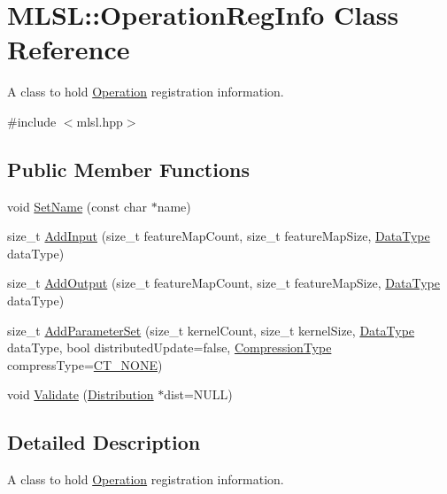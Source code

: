 \hypertarget{classMLSL_1_1OperationRegInfo}{\section{M\-L\-S\-L\-:\-:Operation\-Reg\-Info Class Reference}
\label{classMLSL_1_1OperationRegInfo}
}


A class to hold \hyperlink{classMLSL_1_1Operation}{Operation} registration information.  




{\ttfamily \#include $<$mlsl.\-hpp$>$}

\subsection*{Public Member Functions}
\begin{DoxyCompactItemize}
\item 
void \hyperlink{classMLSL_1_1OperationRegInfo_a3ed51c1c39660fb44f56a2b26ced6e20}{Set\-Name} (const char $\ast$name)
\item 
size\-\_\-t \hyperlink{classMLSL_1_1OperationRegInfo_a2c161b0c438d107ee7382f72021c2c66}{Add\-Input} (size\-\_\-t feature\-Map\-Count, size\-\_\-t feature\-Map\-Size, \hyperlink{namespaceMLSL_a09825f36959e78645dd9bc70bdf840ba}{Data\-Type} data\-Type)
\item 
size\-\_\-t \hyperlink{classMLSL_1_1OperationRegInfo_a45cbce304460cf8ca13adb7b2ed194ce}{Add\-Output} (size\-\_\-t feature\-Map\-Count, size\-\_\-t feature\-Map\-Size, \hyperlink{namespaceMLSL_a09825f36959e78645dd9bc70bdf840ba}{Data\-Type} data\-Type)
\item 
size\-\_\-t \hyperlink{classMLSL_1_1OperationRegInfo_ad5212c42654f0fe581684dfd8c327e3a}{Add\-Parameter\-Set} (size\-\_\-t kernel\-Count, size\-\_\-t kernel\-Size, \hyperlink{namespaceMLSL_a09825f36959e78645dd9bc70bdf840ba}{Data\-Type} data\-Type, bool distributed\-Update=false, \hyperlink{namespaceMLSL_a68b033a19889eaa288c1d10b85d23ea2}{Compression\-Type} compress\-Type=\hyperlink{namespaceMLSL_a68b033a19889eaa288c1d10b85d23ea2aff711dbf9b304ee795e007e5e667cd52}{C\-T\-\_\-\-N\-O\-N\-E})
\item 
void \hyperlink{classMLSL_1_1OperationRegInfo_ab85cd09ead3ca351625f457a1e88555b}{Validate} (\hyperlink{classMLSL_1_1Distribution}{Distribution} $\ast$dist=N\-U\-L\-L)
\end{DoxyCompactItemize}


\subsection{Detailed Description}
A class to hold \hyperlink{classMLSL_1_1Operation}{Operation} registration information. 

